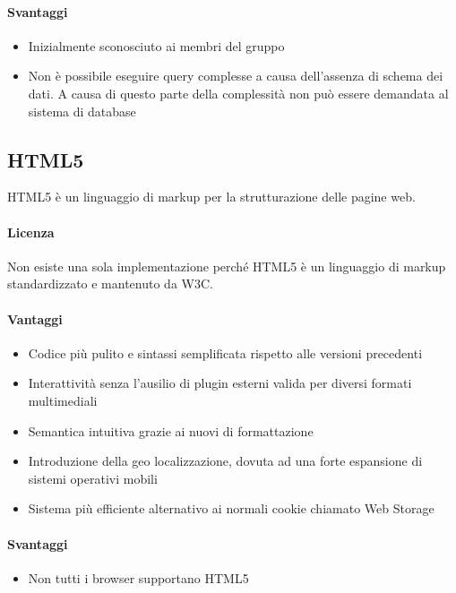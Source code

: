 \paragraph{Svantaggi} 
\begin{itemize}
	\item Inizialmente sconosciuto ai membri del gruppo
     \item Non è possibile eseguire query complesse a causa
       dell'assenza di schema dei dati. A causa di questo parte della
       complessità non può essere demandata al sistema di database
\end{itemize}

\subsection{HTML5}
HTML5 è un linguaggio di markup per la strutturazione delle pagine web.

\paragraph{Licenza}  
Non esiste una sola implementazione perché HTML5 è un linguaggio di markup standardizzato e mantenuto da W3C.



\paragraph{Vantaggi}
\begin{itemize}
	\item Codice più pulito e sintassi semplificata rispetto alle versioni precedenti
	\item Interattività senza l’ausilio di plugin esterni valida per diversi formati multimediali
	\item Semantica intuitiva grazie ai nuovi  di formattazione
	\item Introduzione della geo localizzazione, dovuta ad una forte espansione di sistemi operativi mobili
	\item Sistema più efficiente alternativo ai normali cookie chiamato Web Storage 

\end{itemize}

\paragraph{Svantaggi} 
\begin{itemize}
	\item Non tutti i browser supportano HTML5
\end{itemize}

